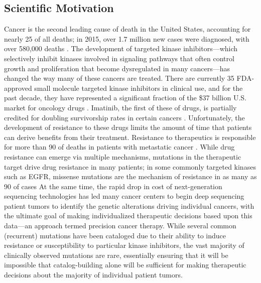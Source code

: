 \documentclass[conference]{IEEEtran}
\begin{document}

\subsection{Scientific Motivation}\label{sec:motivation}

Cancer is the second leading cause of death in the United States, accounting for nearly 25 of all deaths; in 2015, over 1.7 million new cases were diagnosed, with over 580,000 deaths \cite{acs-cancer-facts-2015}. The development of targeted kinase inhibitors—which selectively inhibit kinases involved in signaling pathways that often control growth and proliferation that become dysregulated in many cancers—has changed the way many of these cancers are treated. There are currently 35 FDA-approved small molecule targeted kinase inhibitors in clinical use, and for the past decade, they have represented a significant fraction of the \$37 billion U.S. market for oncology drugs \cite{FDA, tkilist}. Imatinib, the first of these of drugs, is partially credited for doubling survivorship rates in certain cancers \cite{tkilist, ACSreport}. Unfortunately, the development of resistance to these drugs limits the amount of time that patients can derive benefits from their treatment. Resistance to therapeutics is responsible for more than 90 of deaths in patients with metastatic cancer \cite{90death}. While drug resistance can emerge via multiple mechanisms, mutations in the therapeutic target drive drug resistance in many patients; in some commonly targeted kinases such as EGFR, missense mutations are the mechanism of resistance in as many as 90 of cases           
At the same time, the rapid drop in cost of next-generation sequencing technologies has led many cancer centers to begin deep sequencing patient tumors to identify the genetic alterations driving individual cancers, with the ultimate goal of making individualized therapeutic decisions based upon this data—an approach termed precision cancer therapy. While several common (recurrent) mutations have been cataloged due to their ability to induce resistance or susceptibility to particular kinase inhibitors, the vast majority of clinically observed mutations are rare, essentially ensuring that it will be impossible that catalog-building alone will be sufficient for making therapeutic decisions about the majority of individual patient tumors.
\end{document}
